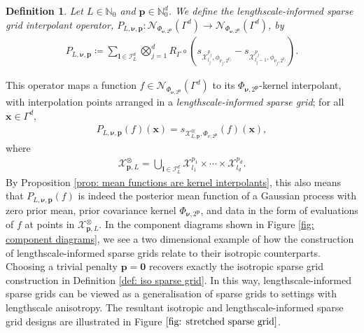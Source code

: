 \documentclass[pdflatex,sn-mathphys-num]{sn-jnl}%
\theoremstyle{thmstyleone}%
\theoremstyle{thmstyletwo}%
\theoremstyle{thmstylethree}%
\newtheorem{definition}{Definition}%
\begin{document}
\begin{definition}\label{def: penalised sparse grid operator}
    Let \(L\in\mathbb{N}_0\) and
    \(\mathbf{p}\in\mathbb{N}_0^d\). We define the \emph{lengthscale-informed sparse grid interpolant operator}, \(P_{L,
    \boldsymbol{\nu},\mathbf{p}}:\mathcal{N}_{\Phi_{\boldsymbol{\nu},2^{\mathbf{p}}}}(\Gamma^d)\rightarrow\mathcal{N}_{\Phi_{\boldsymbol{\nu},2^{\mathbf{p}}}}(\Gamma^d)\), by 
\begin{align}
    P_{L,\boldsymbol{\nu}
    ,\mathbf{p}}\coloneqq \sum_{\boldsymbol{l}\in\mathcal{I}^d_L}\bigotimes_{j=1}^dR_{\Gamma}\circ\left(s_{\mathcal{X}_{l_j}^{p_j},\phi_{\nu_j,2^{p_j}}}-s_{\mathcal{X}_{l_j-1}^{p_j},\phi_{\nu_j,2^{p_j}}}\right).
\end{align}
\end{definition}
This operator maps a function \(f\in\mathcal{N}_{\Phi_{\boldsymbol{\nu},2^{\mathbf{p}}}}(\Gamma^d)\) to its \(\Phi_{\boldsymbol{\nu},2^{\mathbf{p}}}\)-kernel interpolant, with interpolation points arranged in a \textit{lengthscale-informed sparse grid}; for all \(\mathbf{x}\in\Gamma^d\),
\begin{align}
    P_{L,\boldsymbol{\nu},\mathbf{p}}(f)(\mathbf{x}) = s_{\mathcal{X}^{\otimes}_{L,\mathbf{p}},\Phi_{\nu,2^{\mathbf{p}}}}(f)(\mathbf{x}),\nonumber
\end{align}
where
\begin{align}
    \mathcal{X}^{\otimes}_{\mathbf{p},L}=\bigcup_{\boldsymbol{l}\in\mathcal{I}_{L}^d}\mathcal{X}^{p_1}_{l_1}\times\cdots\times\mathcal{X}^{p_d}_{l_d}.\nonumber
\end{align}
By Proposition \ref{prop: mean functions are kernel interpolants}, this also means that \(P_{L,\boldsymbol{\nu},\mathbf{p}}(f)\) is indeed the posterior mean function of a Gaussian process with zero prior mean, prior covariance kernel \(\Phi_{\boldsymbol{\nu},2^{\mathbf{p}}}\), and data in the form of evaluations of \(f\) at points in \(\mathcal{X}^{\otimes}_{\mathbf{p},L}\). In the component diagrams shown in Figure \ref{fig: component diagrams}, we see a two dimensional example of how the construction of lengthscale-informed sparse grids relate to their isotropic counterparts. Choosing a trivial penalty \(\mathbf{p}=\mathbf{0}\) recovers exactly the isotropic sparse grid construction in Definition \ref{def: iso sparse grid}. In this way, lengthscale-informed sparse grids can be viewed as a generalisation of sparse grids to settings with lengthscale anisotropy. The resultant isotropic and lengthscale-informed sparse grid designs are illustrated in Figure \(\ref{fig: stretched sparse grid}\). 
\end{document}
